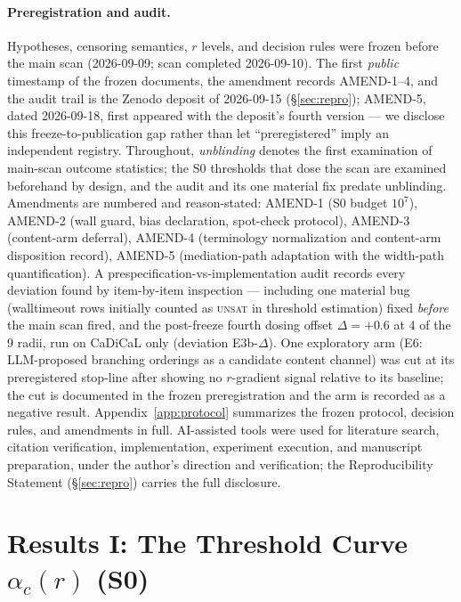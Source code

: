 \documentclass[pdflatex,sn-basic,Numbered]{sn-jnl}
\newcommand{\ac}[1]{\ensuremath{\alpha_c(#1)}}
\begin{document}
\paragraph{Preregistration and audit.}
Hypotheses, censoring semantics, $r$ levels, and decision rules were frozen
before the main scan (2026-09-09; scan completed 2026-09-10). The first
\emph{public} timestamp of the frozen documents, the amendment records
AMEND-1--4, and the audit trail is the Zenodo deposit of 2026-09-15
(\S\ref{sec:repro}); AMEND-5, dated 2026-09-18, first appeared with the
deposit's fourth version --- we disclose this freeze-to-publication gap rather than let
``preregistered'' imply an independent registry. Throughout,
\emph{unblinding} denotes the first examination of main-scan outcome
statistics; the S0 thresholds that dose the scan are examined beforehand by
design, and the audit and its one material fix predate unblinding.
Amendments are numbered and reason-stated: AMEND-1 (S0
budget $10^7$), AMEND-2 (wall guard, bias declaration, spot-check protocol),
AMEND-3 (content-arm deferral), AMEND-4 (terminology normalization and
content-arm disposition record), AMEND-5 (mediation-path adaptation with the
width-path quantification). A prespecification-vs-implementation audit
records every deviation found by item-by-item inspection --- including one
material bug (walltimeout rows initially counted as \textsc{unsat} in
threshold estimation) fixed \emph{before} the main scan fired, and the
post-freeze fourth dosing offset $\Delta{=}{+}0.6$ at 4 of the 9 radii,
run on CaDiCaL only (deviation E3b-$\Delta$). One exploratory
arm (E6: LLM-proposed branching orderings as a candidate content channel) was
cut at its preregistered stop-line after showing no $r$-gradient signal
relative to its baseline; the cut is documented in the frozen preregistration
and the arm is recorded as a negative result. Appendix~\ref{app:protocol}
summarizes the frozen protocol, decision rules, and amendments in full.
AI-assisted tools were used for literature search, citation verification,
implementation, experiment execution, and manuscript preparation, under the
author's direction and verification; the Reproducibility Statement
(\S\ref{sec:repro}) carries the full disclosure.

\section{Results I: The Threshold Curve \texorpdfstring{$\ac{r}$}{alpha\_c(r)} (S0)}
\label{sec:s0}
\end{document}
